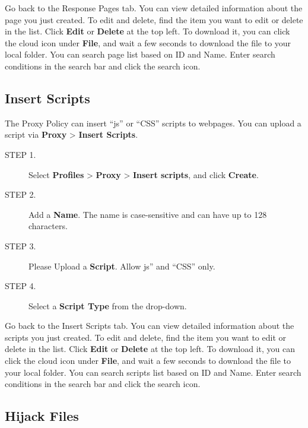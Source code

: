 Go back to the Response Pages tab. You can view detailed information about the page you just created. 
To edit and delete, find the item you want to edit or delete in the list. Click \textbf{Edit} or \textbf{Delete} at the top left. 
To download it, you can click the cloud icon under \textbf{File}, and wait a few seconds to download the file to your local folder. 
You can search page list based on ID and Name. Enter search conditions in the search bar and click the search icon.

\subsection*{\hypertarget{link:Insert Scripts}{Insert Scripts}}
\label{sec:decrypt:profile:insert}

The Proxy Policy can insert “js” or “CSS” scripts to webpages. You can upload a script via \textbf{Proxy} > \textbf{Insert Scripts}.

\begin{description}
    \item[STEP 1.]	Select \textbf{Profiles} > \textbf{Proxy} > \textbf{Insert scripts}, and click \textbf{Create}.
    \item[STEP 2.]	Add a \textbf{Name}. The name is case-sensitive and can have up to 128 characters.
    \item[STEP 3.]	Please Upload a \textbf{Script}. Allow js” and “CSS” only.
    \item[STEP 4.]	Select a \textbf{Script Type} from the drop-down.     
\end{description}    

Go back to the Insert Scripts tab. You can view detailed information about the scripts you just created. 
To edit and delete, find the item you want to edit or delete in the list. 
Click \textbf{Edit} or \textbf{Delete} at the top left. To download it, you can click the cloud icon under \textbf{File}, 
and wait a few seconds to download the file to your local folder. 
You can search scripts list based on ID and Name. Enter search conditions in the search bar and click the search icon.

\subsection*{\hypertarget{link:Hijack Files}{Hijack Files}}
\label{sec:decrypt:profile:hijack}

